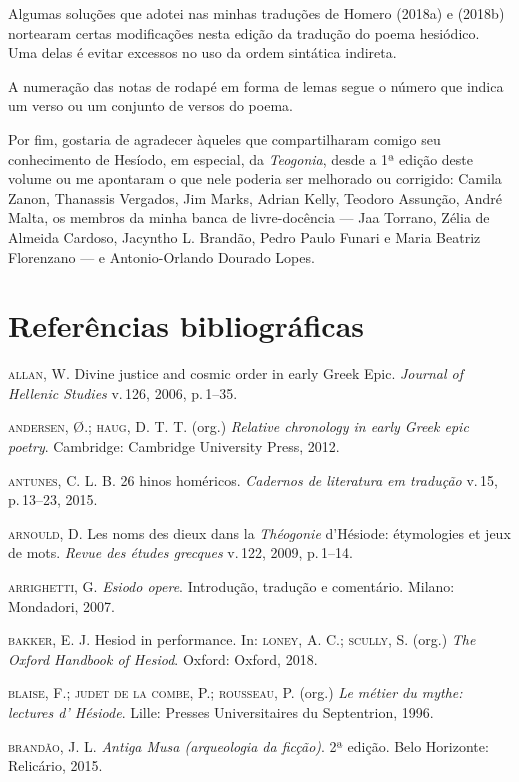 Algumas soluções que adotei nas minhas traduções de Homero (2018a) e
(2018b) nortearam certas modificações nesta edição da tradução do poema
hesiódico. Uma delas é evitar excessos no uso da ordem sintática
indireta.

A numeração das notas de rodapé em forma de lemas segue o número que
indica um verso ou um conjunto de versos do poema.

Por fim, gostaria de agradecer àqueles que compartilharam comigo seu
conhecimento de Hesíodo, em especial, da \textit{Teogonia}, desde a 1ª
edição deste volume ou me apontaram o que nele poderia ser melhorado ou
corrigido: Camila Zanon, Thanassis Vergados, Jim Marks, Adrian Kelly,
Teodoro Assunção, André Malta, os membros da minha banca de
livre-docência --- Jaa Torrano, Zélia de Almeida Cardoso, Jacyntho L.
Brandão, Pedro Paulo Funari e Maria Beatriz Florenzano --- e
Antonio-Orlando Dourado Lopes.

\section{Referências bibliográficas}

\textsc{allan}, W. Divine justice and cosmic order in early Greek Epic.
\textit{Journal of Hellenic Studies} v.\,126, 2006, p.\,1--35.

\textsc{andersen}, Ø.; \textsc{haug}, D. T. T. (org.) \textit{Relative chronology in early
Greek epic poetry}. Cambridge: Cambridge University Press, 2012.

\textsc{antunes}, C. L. B. 26 hinos homéricos. \textit{Cadernos de literatura em
tradução} v.\,15, p.\,13--23, 2015.

\textsc{arnould}, D. Les noms des dieux dans la \textit{Théogonie} d'Hésiode:
étymologies et jeux de mots. \textit{Revue des études grecques} v.\,122,
2009, p.\,1--14.

\textsc{arrighetti}, G. \textit{Esiodo opere}. Introdução, tradução e comentário.
Milano: Mondadori, 2007.

\textsc{bakker}, E. J. Hesiod in performance. In: \textsc{loney}, A. C.; \textsc{scully}, S. (org.)
\textit{The Oxford Handbook of Hesiod}. Oxford: Oxford, 2018.

\textsc{blaise}, F.; \textsc{judet de la combe}, P.; \textsc{rousseau}, P. (org.) \textit{Le métier
du mythe: lectures d' Hésiode}. Lille: Presses Universitaires du
Septentrion, 1996.

\textsc{brandão}, J. L. \textit{Antiga Musa (arqueologia da ficção)}. 2ª edição.
Belo Horizonte: Relicário, 2015.

